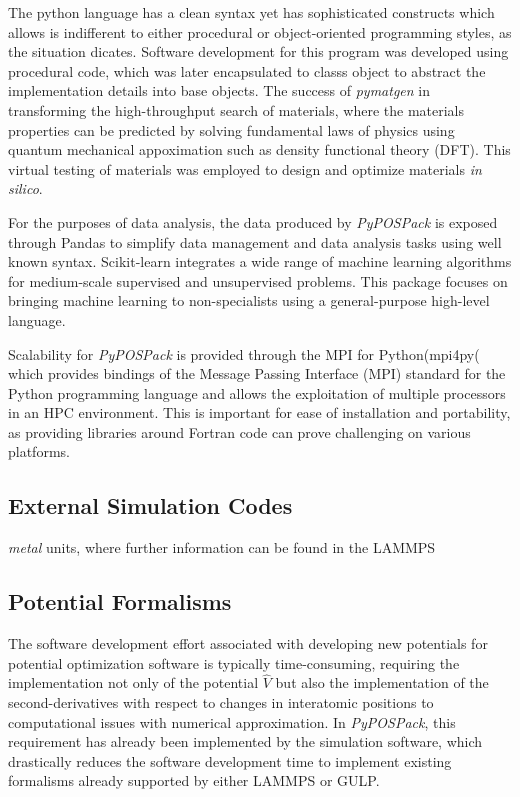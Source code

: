 The python language has a clean syntax yet has sophisticated constructs which allows is indifferent to either procedural or object-oriented programming styles, as the situation dicates.  Software development for this program was developed using procedural code, which was later encapsulated to classs object to abstract the implementation details into base objects.  The success of \emph{pymatgen} in transforming the high-throughput search of materials,  where the materials properties can be predicted by solving fundamental laws of physics using quantum mechanical appoximation such as density functional theory (DFT).  This virtual testing of materials was employed to design and optimize materials \emph{in silico}.

For the purposes of data analysis, the data produced by \emph{PyPOSPack} is exposed through Pandas\cite{mckinney2010_pandas} to simplify data management and data analysis tasks using well known syntax.
Scikit-learn\cite{pedregosa2011_sklearn} integrates a wide range of machine learning algorithms for medium-scale supervised and unsupervised problems. This package focuses on bringing machine learning to non-specialists using a general-purpose high-level language.

Scalability for \emph{PyPOSPack} is provided through the MPI for Python(mpi4py(\cite{dalcin2005_mpi4py,dalcin2008_mpi4py} which provides bindings of the Message Passing Interface (MPI)\cite{mpi2015} standard for the Python programming language and allows the exploitation of multiple processors in an HPC environment.  This is important for ease of installation and portability, as providing libraries around Fortran code can prove challenging on various platforms.
\subsection{External Simulation Codes}

\emph{metal} units, where further information can be found in the LAMMPS 

\subsection{Potential Formalisms}

The software development effort associated with developing new potentials for potential optimization software is typically time-consuming, requiring the implementation not only of the potential $\hat{V}$ but also the implementation of the second-derivatives with respect to changes in interatomic positions to computational issues with numerical approximation.  In \emph{PyPOSPack}, this requirement has already been implemented by the simulation software, which drastically reduces the software development time to implement existing formalisms already supported by either LAMMPS or GULP.


